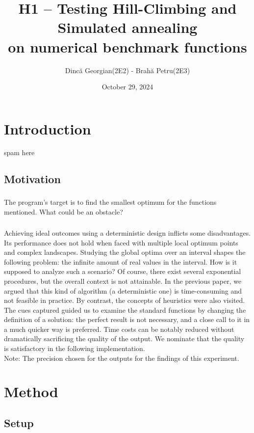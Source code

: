 \documentclass{article}
\title{H1 – Testing Hill-Climbing and Simulated annealing \\ on numerical benchmark functions}
\author{Dincă Georgian(2E2) - Brahă Petru(2E3)}
\date{October 29, 2024}
\begin{document}
\maketitle



\section{Introduction}

spam here

\subsection{Motivation}

\subparagraph{}
The program's target is to find the smallest optimum for the functions mentioned. What could be an obstacle?

\subparagraph{}
Achieving ideal outcomes using a deterministic design inflicts some disadvantages. Its performance does not hold when faced with multiple local optimum points and complex landscapes. Studying the global optima over an interval shapes the following problem: the infinite amount of real values in the interval. How is it supposed to analyze such a scenario? Of course, there exist several exponential procedures, but the overall context is not attainable. In the previous paper, we argued that this kind of algorithm (a deterministic one) is time-consuming and not feasible in practice. By contrast, the concepts of heuristics were also visited. The cues captured guided us to examine the standard functions by changing the definition of a solution: the perfect result is not necessary, and a close call to it in a much quicker way is preferred. Time costs can be notably reduced without dramatically sacrificing the quality of the output. We nominate that the quality is satisfactory in the following implementation. \\

Note: The precision chosen for the outputs for the findings of this experiment.


\section{Method}

\subsection{Setup}
\end{document}
